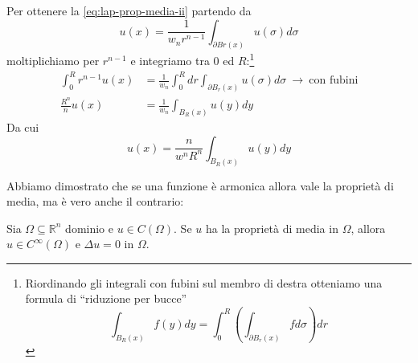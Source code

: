 \documentclass[10pt,a4paper,twoside,openright]{book}
\begin{document}
\begin{dimostrazione}
	Per ottenere la \eqref{eq:lap-prop-media-ii} partendo da
	\begin{equation*}
		u(x) =\frac{1}{w_{n} r^{n-1}}\int _{\partial Br(x)} u(\sigma) d\sigma 
	\end{equation*}
	moltiplichiamo per $\displaystyle r^{n-1}$ e integriamo tra $\displaystyle 0$ ed $\displaystyle R$:\footnote{Riordinando gli integrali con fubini sul membro di destra otteniamo una formula di ``riduzione per bucce''
		\begin{equation*}
			\int _{B_{R}(x)} f(y) dy=\int ^{R}_{0}\left(\int _{\partial B_{r}(x)} fd\sigma \right) dr
		\end{equation*}
	}
	\begin{align*}
		\int ^{R}_{0} r^{n-1} u(x) & =\frac{1}{w_{n}}\int ^{R}_{0} dr\int _{\partial B_{r}(x)} u(\sigma) d\sigma \ \rightarrow \ \text{con fubini} \\
		\frac{R^{n}}{n} u(x)       & =\frac{1}{w_{n}}\int _{B_{R}(x)} u(y) dy                                                                    
	\end{align*}
	Da cui 
	\begin{equation*}
		u(x) =\frac{n}{w^{n} R^{n}}\int _{B_{R}(x)} u(y) dy
	\end{equation*}
\end{dimostrazione}
Abbiamo dimostrato che se una funzione è armonica allora vale la proprietà di media, ma è vero anche il contrario:
\begin{theorem}
	Sia $\displaystyle \Omega \subseteq \mathbb{R}^{n}$ dominio e $\displaystyle u\in C(\Omega)$. Se $\displaystyle u$ ha la proprietà di media in $\displaystyle \Omega $, allora $\displaystyle u\in C^{\infty }(\Omega)$ e $\displaystyle \Delta u=0$ in $\displaystyle \Omega $.
\end{theorem}
\end{document}
